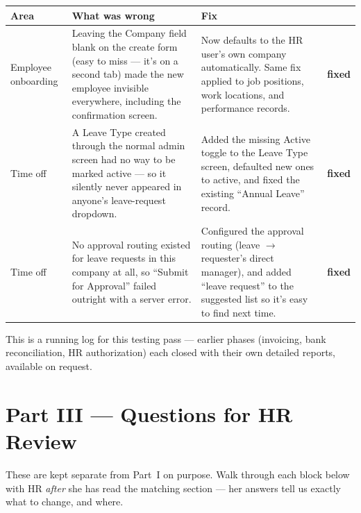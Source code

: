 \documentclass[11pt,a4paper]{article}
\begin{document}
\begin{longtable}{@{}p{2.6cm}p{5.6cm}p{5.6cm}c@{}}
\toprule
\textbf{Area} & \textbf{What was wrong} & \textbf{Fix} & \\
\midrule
\endhead
Employee onboarding &
Leaving the Company field blank on the create form (easy to miss --- it's on a second tab) made the new employee invisible everywhere, including the confirmation screen. &
Now defaults to the HR user's own company automatically. Same fix applied to job positions, work locations, and performance records. &
\cellcolor{accentsoft}\textcolor{accentdark}{\textbf{fixed}} \\
\addlinespace
Time off &
A Leave Type created through the normal admin screen had no way to be marked active --- so it silently never appeared in anyone's leave-request dropdown. &
Added the missing Active toggle to the Leave Type screen, defaulted new ones to active, and fixed the existing ``Annual Leave'' record. &
\cellcolor{accentsoft}\textcolor{accentdark}{\textbf{fixed}} \\
\addlinespace
Time off &
No approval routing existed for leave requests in this company at all, so ``Submit for Approval'' failed outright with a server error. &
Configured the approval routing (leave $\rightarrow$ requester's direct manager), and added ``leave request'' to the suggested list so it's easy to find next time. &
\cellcolor{accentsoft}\textcolor{accentdark}{\textbf{fixed}} \\
\bottomrule
\end{longtable}

\begin{note}
This is a running log for this testing pass --- earlier phases (invoicing, bank reconciliation, HR authorization) each closed with their own detailed reports, available on request.
\end{note}

\newpage
\part*{Part III --- Questions for HR Review}

\begin{callout}
These are kept separate from Part~I on purpose. Walk through each block below with HR \emph{after} she has read the matching section --- her answers tell us exactly what to change, and where.
\end{callout}
\end{document}

